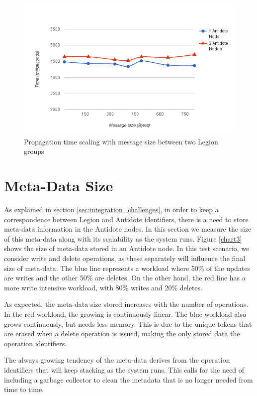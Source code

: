 \begin{figure}[H]
\centering
\includegraphics[scale=0.7]{files/chart5.png}
\caption{Propagation time scaling with message size between two Legion groups}
\label{chart5}
\end{figure}

\section{Meta-Data Size}
\label{sec:meta-data_size}
As explained in section \ref{sec:integration_challenges}, in order to keep a correspondence between Legion and Antidote identifiers, there is a need to store meta-data information in the Antidote nodes. In this section we measure the size of this meta-data along with its scalability as the system runs. Figure \ref{chart3} shows the size of meta-data stored in an Antidote node. In this test scenario, we consider write and delete operations, as these separately will influence the final size of meta-data. The blue line represents a workload where 50\% of the updates are writes and the other 50\% are deletes. On the other hand, the red line has a more write intensive workload, with 80\% writes and 20\% deletes.\par
	As expected, the meta-data size stored increases with the number of operations. In the red workload, the growing is continuously linear. The blue workload also grows continuously, but needs less memory. This is due to the unique tokens that are erased when a delete operation is issued, making the only stored data the operation identifiers.\par
	The always growing tendency of the meta-data derives from the operation identifiers that will keep stacking as the system runs. This calls for the need of including a garbage collector to clean the metadata that is no longer needed from time to time.

